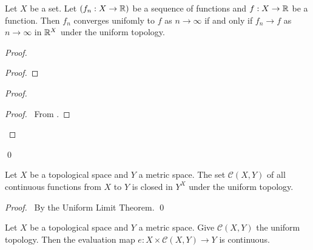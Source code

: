 \begin{proposition}
    Let $X$ be a set. Let $(f_n : X \rightarrow \mathbb{R})$ be a sequence of functions and $f : X \rightarrow \mathbb{R}$ be a function.
    Then $f_n$ converges unifomly to $f$ as $n \rightarrow \infty$ if and only if $f_n \rightarrow f$ as $n \rightarrow \infty$
    in $\mathbb{R}^X$ under the uniform topology.
\end{proposition}

\begin{proof}
    \pf
    \begin{proof}
    \end{proof}
    \begin{proof}
        \begin{proof}
            \pf\ From .
        \end{proof}
    \end{proof}
    \qed
\end{proof}

\begin{corollary}
    Let $X$ be a topological space and $Y$ a metric space. The set $\mathcal{C}(X,Y)$ of all continuous functions from $X$ to $Y$
    is closed in $Y^X$ under the uniform topology.
\end{corollary}

\begin{proof}
    \pf\ By the Uniform Limit Theorem. \qed
\end{proof}

\begin{proposition}
    Let $X$ be a topological space and $Y$ a metric space. Give $\mathcal{C}(X,Y)$ the uniform topology. Then the evaluation map
    $e : X \times \mathcal{C}(X,Y) \rightarrow Y$ is continuous.
\end{proposition}

